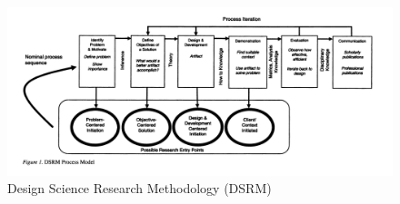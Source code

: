 \begin{figure}
\includegraphics[width=\textwidth,trim={0 3cm 0 0},clip]{pfeffers}
\caption{\citet[p.~54]{Peffers:2007:DSR:1481765.1481768} Design Science Research Methodology (DSRM)\label{fig:dsrm}}
\end{figure}
